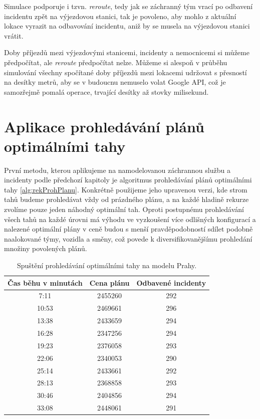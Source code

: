 Simulace podporuje i tzvn. \textit{reroute}, tedy jak se záchranný tým vrací po odbavení incidentu zpět na výjezdovou stanici,
tak je povoleno, aby mohlo z aktuální lokace vyrazit na odbavování incidentu, aniž by se musela na výjezdovou stanici vrátit.

Doby příjezdů mezi výjezdovými stanicemi, incidenty a nemocnicemi si můžeme předpočítat, ale \textit{reroute} předpočítat nelze.
Můžeme si alespoň v průběhu simulování všechny spočítané doby příjezdů mezi lokacemi udržovat s přesností na desítky metrů,
aby se v budoucnu nemuselo volat Google API, což je samozřejmě pomalá operace, trvající desítky až stovky milisekund. 

\section{Aplikace prohledávání plánů optimálními \linebreak tahy}

První metodu, kterou aplikujeme na namodelovanou záchrannou službu a incidenty podle předchozí kapitoly je algoritmus prohledávání plánů optimálními tahy \ref{alg:rekProhPlanu}.
Konkrétně použijeme jeho upravenou verzi, kde strom tahů budeme prohledávat vždy od prázdného plánu, a na každé hladině rekurze zvolíme pouze jeden náhodný optimální tah.
Oproti postupnému prohledávání všech tahů na každé úrovni má výhodu ve vyzkoušení více odlišných konfigurací a nalezené optimální plány v ceně budou s menší pravděpodobností sdílet
podobně naalokované týmy, vozidla a směny, což povede k diversifikovanějšímu prohledání množiny povolených plánů.

\begin{table}[h!]
\centering
\begin{tabular}{|c|c|c|}
\hline
\textbf{Čas běhu v minutách} & \textbf{Cena plánu} & \textbf{Odbavené incidenty} \\
\hline
7:11 & 2455260 & 292 \\
\hline
10:53 & 2469661 & 296 \\
\hline
13:38 & 2433659 & 294 \\
\hline
16:28 & 2347256 & 294 \\
\hline
19:23 & 2376058 & 293 \\
\hline
22:06 & 2340053 & 290 \\
\hline
25:14 & 2433661 & 292 \\
\hline
28:13 & 2368858 & 293 \\
\hline
30:46 & 2404856 & 294 \\
\hline
33:08 & 2448061 & 291 \\
\hline
\end{tabular}
\caption{Spuštění prohledávání optimálními tahy na modelu Prahy.}
\label{table:optimalMovesTabulka}
\end{table}

